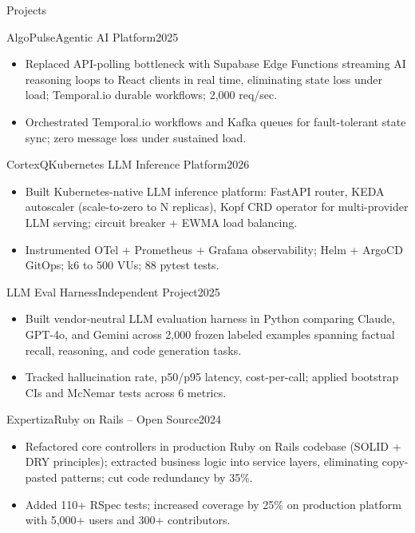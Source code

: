 \documentclass[]{mcdowellcv}
\begin{document}
\begin{cvsection}{Projects}
  \begin{cvsubsection}{AlgoPulse}{Agentic AI Platform}{2025}
    \begin{itemize}
      \item Replaced API-polling bottleneck with Supabase Edge Functions streaming AI reasoning loops to React clients in real time, eliminating state loss under load; Temporal.io durable workflows; 2,000 req/sec.
      \item Orchestrated Temporal.io workflows and Kafka queues for fault-tolerant state sync; zero message loss under sustained load.
    \end{itemize}
    \vspace{-1.5pt}
  \end{cvsubsection}

  \begin{cvsubsection}{CortexQ}{Kubernetes LLM Inference Platform}{2026}
    \begin{itemize}
      \item Built Kubernetes-native LLM inference platform: FastAPI router, KEDA autoscaler (scale-to-zero to N replicas), Kopf CRD operator for multi-provider LLM serving; circuit breaker + EWMA load balancing.
      \item Instrumented OTel + Prometheus + Grafana observability; Helm + ArgoCD GitOps; k6 to 500 VUs; 88 pytest tests.
    \end{itemize}
    \vspace{-1.5pt}
  \end{cvsubsection}

  \begin{cvsubsection}{LLM Eval Harness}{Independent Project}{2025}
    \begin{itemize}
      \item Built vendor-neutral LLM evaluation harness in Python comparing Claude, GPT-4o, and Gemini across 2,000 frozen labeled examples spanning factual recall, reasoning, and code generation tasks.
      \item Tracked hallucination rate, p50/p95 latency, cost-per-call; applied bootstrap CIs and McNemar tests across 6 metrics.
    \end{itemize}
    \vspace{-1.5pt}
  \end{cvsubsection}

  \begin{cvsubsection}{Expertiza}{Ruby on Rails -- Open Source}{2024}
    \begin{itemize}
      \item Refactored core controllers in production Ruby on Rails codebase (SOLID + DRY principles); extracted business logic into service layers, eliminating copy-pasted patterns; cut code redundancy by 35\%.
      \item Added 110+ RSpec tests; increased coverage by 25\% on production platform with 5,000+ users and 300+ contributors.
    \end{itemize}
  \end{cvsubsection}
\end{cvsection}
\end{document}
